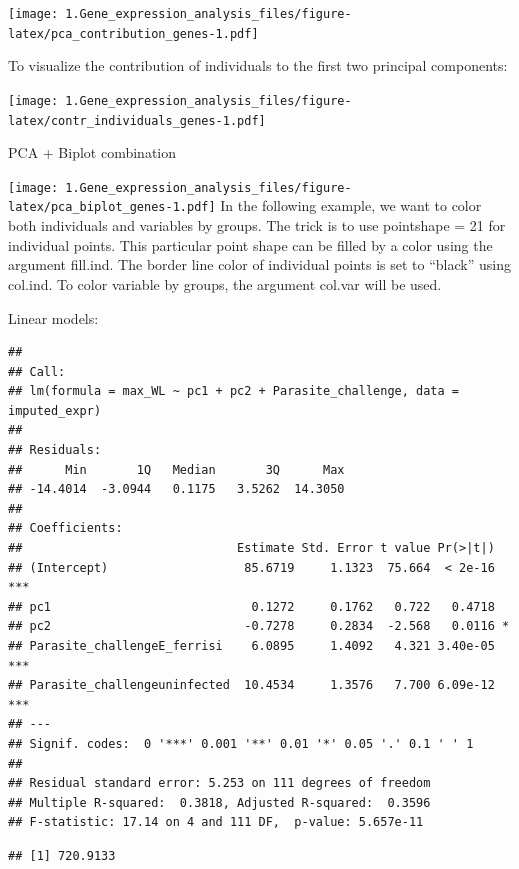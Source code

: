 \documentclass[
]{article}
\begin{document}
\texttt{[image: 1.Gene\_expression\_analysis\_files/figure-latex/pca\_contribution\_genes-1.pdf]}

To visualize the contribution of individuals to the first two principal
components:

\texttt{[image: 1.Gene\_expression\_analysis\_files/figure-latex/contr\_individuals\_genes-1.pdf]}

PCA + Biplot combination

\texttt{[image: 1.Gene\_expression\_analysis\_files/figure-latex/pca\_biplot\_genes-1.pdf]}
In the following example, we want to color both individuals and
variables by groups. The trick is to use pointshape = 21 for individual
points. This particular point shape can be filled by a color using the
argument fill.ind. The border line color of individual points is set to
``black'' using col.ind. To color variable by groups, the argument
col.var will be used.

Linear models:

\begin{verbatim}
## 
## Call:
## lm(formula = max_WL ~ pc1 + pc2 + Parasite_challenge, data = imputed_expr)
## 
## Residuals:
##      Min       1Q   Median       3Q      Max 
## -14.4014  -3.0944   0.1175   3.5262  14.3050 
## 
## Coefficients:
##                              Estimate Std. Error t value Pr(>|t|)    
## (Intercept)                   85.6719     1.1323  75.664  < 2e-16 ***
## pc1                            0.1272     0.1762   0.722   0.4718    
## pc2                           -0.7278     0.2834  -2.568   0.0116 *  
## Parasite_challengeE_ferrisi    6.0895     1.4092   4.321 3.40e-05 ***
## Parasite_challengeuninfected  10.4534     1.3576   7.700 6.09e-12 ***
## ---
## Signif. codes:  0 '***' 0.001 '**' 0.01 '*' 0.05 '.' 0.1 ' ' 1
## 
## Residual standard error: 5.253 on 111 degrees of freedom
## Multiple R-squared:  0.3818, Adjusted R-squared:  0.3596 
## F-statistic: 17.14 on 4 and 111 DF,  p-value: 5.657e-11
\end{verbatim}

\begin{verbatim}
## [1] 720.9133
\end{verbatim}
\end{document}
